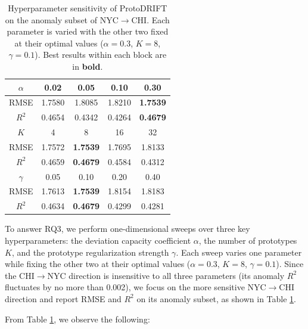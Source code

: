 \begin{table}[htbp]
\centering
\setlength{\tabcolsep}{8pt}
\renewcommand\arraystretch{1.0}
\begin{tabular}{c|cccc}
\toprule
$\alpha$ & 0.02 & 0.05 & 0.10 & 0.30 \\
\midrule
RMSE  & 1.7580 & 1.8085 & 1.8210 & \textbf{1.7539} \\
$R^2$ & 0.4654 & 0.4342 & 0.4264 & \textbf{0.4679} \\
\midrule
$K$ & 4 & 8 & 16 & 32 \\
\midrule
RMSE  & 1.7572 & \textbf{1.7539} & 1.7695 & 1.8133 \\
$R^2$ & 0.4659 & \textbf{0.4679} & 0.4584 & 0.4312 \\
\midrule
$\gamma$ & 0.05 & 0.10 & 0.20 & 0.40 \\
\midrule
RMSE  & 1.7613 & \textbf{1.7539} & 1.8154 & 1.8183 \\
$R^2$ & 0.4634 & \textbf{0.4679} & 0.4299 & 0.4281 \\
\bottomrule
\end{tabular}
\caption{Hyperparameter sensitivity of ProtoDRIFT on the anomaly subset of NYC$\rightarrow$CHI. Each parameter is varied with the other two fixed at their optimal values ($\alpha=0.3$, $K=8$, $\gamma=0.1$). Best results within each block are in \textbf{bold}.}
\label{tab:sensitivity}
\end{table}

To answer RQ3, we perform one-dimensional sweeps over three key hyperparameters: the deviation capacity coefficient $\alpha$, the number of prototypes $K$, and the prototype regularization strength $\gamma$. Each sweep varies one parameter while fixing the other two at their optimal values ($\alpha=0.3$, $K=8$, $\gamma=0.1$). Since the CHI$\rightarrow$NYC direction is insensitive to all three parameters (its anomaly $R^2$ fluctuates by no more than 0.002), we focus on the more sensitive NYC$\rightarrow$CHI direction and report RMSE and $R^2$ on its anomaly subset, as shown in Table \ref{tab:sensitivity}.

From Table \ref{tab:sensitivity}, we observe the following:

